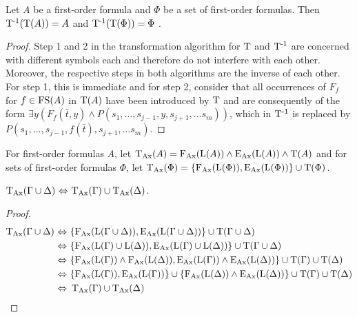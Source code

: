 \begin{lemma}
	\label{lemma:tinv}
	Let $A$ be a first-order formula and $\Phi$ be a set of first-order formulas.
	Then 
	$\TransInv(\Trans(A)) = A$
	and
	$\TransInv(\Trans(\Phi)) = \Phi$
	.
\end{lemma}
\begin{proof}
	Step 1 and 2 in the transformation algorithm for $\Trans$ and $\TransInv$ are concerned with different symbols each and therefore do not interfere with each other.
	Moreover, the respective steps in both algorithms are the inverse of each other.
	For step 1, this is immediate and for step 2, consider that all occurrences of $F_f$ for $f \in \FS(A)$ in $\Trans(A)$ have been introduced by $\Trans$ and are consequently of the form
	$\exists y (F_f(\bar t, y) \land P(s_1, \ldots, s_{j-1}, y, s_{j+1}, \ldots s_m))$, which in $\TransInv$ is replaced by 
$P(s_1, \ldots, s_{j-1},\allowbreak f(\bar t),\allowbreak s_{j+1}, \ldots s_m)$.
\end{proof}

\begin{defi}
	For first-order formulas $A$, let $\TransAll(A) = \FAX(\Lang(A)) \land \EAX(\Lang(A)) \land \Trans(A)$ and for sets of first-order formulas $\Phi$, let $\TransAll(\Phi) = \{\FAX(\Lang(\Phi)), \EAX(\Lang(\Phi))\} \cup \Trans(\Phi)$.
\end{defi}

\begin{lemma}
	\label{lemma:trans_transform}
	$\TransAll(\Gamma \cup \Delta)\,\liff\,\TransAll(\Gamma) \cup \TransAll(\Delta)$.
\end{lemma}
\begin{proof}
	\begin{align*}
		\TransAll(\Gamma \cup \Delta)\,\liff~&\{\FAX(\Lang(\Gamma\cup\Delta)), \EAX(\Lang(\Gamma \cup\Delta))\} \cup \Trans(\Gamma \cup \Delta) \\
		\liff~&\{\FAX(\Lang(\Gamma)\cup\Lang(\Delta)), \EAX(\Lang(\Gamma)\cup\Lang(\Delta))\} \cup \Trans(\Gamma \cup \Delta) \\
		\liff~&\{\FAX(\Lang(\Gamma)) \land \FAX(\Lang(\Delta)), \EAX(\Lang(\Gamma)) \land \EAX(\Lang(\Delta))\} \cup \Trans(\Gamma) \cup \Trans(\Delta) \\
		\liff~&\{\FAX(\Lang(\Gamma)),\EAX(\Lang(\Gamma))\} \cup \{\FAX(\Lang(\Delta)) \land \EAX(\Lang(\Delta))\} \cup \Trans(\Gamma) \cup \Trans(\Delta) \\
		\liff~&\TransAll(\Gamma) \cup \TransAll(\Delta)
		\qedhere
	\end{align*}
\end{proof}

